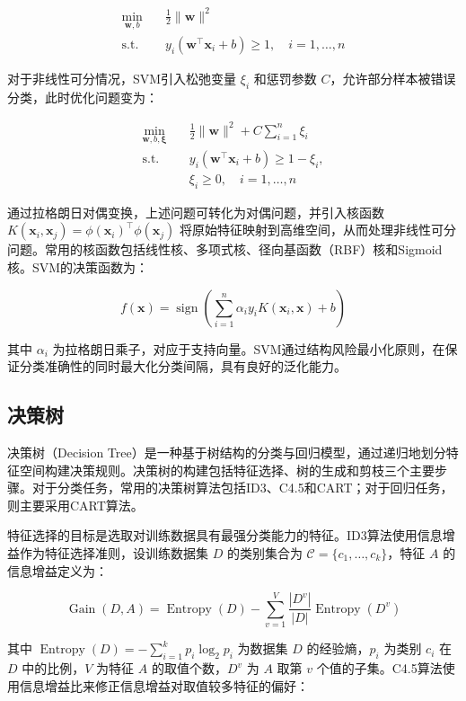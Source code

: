 \documentclass[12pt, a4paper, UTF8]{ctexart}
\begin{document}
\[
\begin{aligned}
\min_{\mathbf{w}, b} \quad & \frac{1}{2} \|\mathbf{w}\|^2 \\
\text{s.t.} \quad & y_i(\mathbf{w}^\top \mathbf{x}_i + b) \geq 1, \quad i = 1, \dots, n
\end{aligned}
\]

对于非线性可分情况，SVM引入松弛变量 $\xi_i$ 和惩罚参数 $C$，允许部分样本被错误分类，此时优化问题变为：

\[
\begin{aligned}
\min_{\mathbf{w}, b, \boldsymbol{\xi}} \quad & \frac{1}{2} \|\mathbf{w}\|^2 + C \sum_{i=1}^n \xi_i \\
\text{s.t.} \quad & y_i(\mathbf{w}^\top \mathbf{x}_i + b) \geq 1 - \xi_i, \\
& \xi_i \geq 0, \quad i = 1, \dots, n
\end{aligned}
\]

通过拉格朗日对偶变换，上述问题可转化为对偶问题，并引入核函数 $K(\mathbf{x}_i, \mathbf{x}_j) = \phi(\mathbf{x}_i)^\top \phi(\mathbf{x}_j)$ 将原始特征映射到高维空间，从而处理非线性可分问题。常用的核函数包括线性核、多项式核、径向基函数（RBF）核和Sigmoid核。SVM的决策函数为：

\[
f(\mathbf{x}) = \operatorname{sign}\left( \sum_{i=1}^n \alpha_i y_i K(\mathbf{x}_i, \mathbf{x}) + b \right)
\]

其中 $\alpha_i$ 为拉格朗日乘子，对应于支持向量。SVM通过结构风险最小化原则，在保证分类准确性的同时最大化分类间隔，具有良好的泛化能力。



\subsection{决策树}\label{sec:enhancement-decisiontree}
决策树（Decision Tree）是一种基于树结构的分类与回归模型，通过递归地划分特征空间构建决策规则。决策树的构建包括特征选择、树的生成和剪枝三个主要步骤。对于分类任务，常用的决策树算法包括ID3、C4.5和CART；对于回归任务，则主要采用CART算法。

特征选择的目标是选取对训练数据具有最强分类能力的特征。ID3算法使用信息增益作为特征选择准则，设训练数据集 $D$ 的类别集合为 $\mathcal{C} = \{c_1, \dots, c_k\}$，特征 $A$ 的信息增益定义为：

\[
\operatorname{Gain}(D, A) = \operatorname{Entropy}(D) - \sum_{v=1}^V \frac{|D^v|}{|D|} \operatorname{Entropy}(D^v)
\]

其中 $\operatorname{Entropy}(D) = -\sum_{i=1}^k p_i \log_2 p_i$ 为数据集 $D$ 的经验熵，$p_i$ 为类别 $c_i$ 在 $D$ 中的比例，$V$ 为特征 $A$ 的取值个数，$D^v$ 为 $A$ 取第 $v$ 个值的子集。C4.5算法使用信息增益比来修正信息增益对取值较多特征的偏好：
\end{document}
